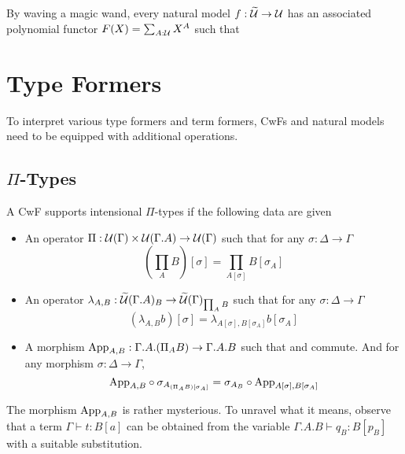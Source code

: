 \documentclass{amsart}
\begin{document}
By waving a magic wand, every natural model $f : \widetilde{\mathcal{U}} \to \mathcal{U}$ has an associated polynomial functor $F(X) = \sum_{A : \mathcal{U}}X^{A}$ such that

\section{Type Formers}
\label{sec:type-formers}

To interpret various type formers and term formers, CwFs and natural models need to be equipped with additional operations.

\subsection{$\Pi$-Types}
\begin{defn}
  A CwF supports intensional $\Pi$-types if the following data are given
  \begin{itemize}
  \item An operator $\Pi : \mathcal{U}(\Gamma) \times \mathcal{U}(\Gamma.A) \to \mathcal{U}(\Gamma)$ such that for any $\sigma : \Delta \to \Gamma$
    \[
      \left(\prod_{A}B\right)[\sigma] = \prod_{A[\sigma]}B[\sigma_{A}]
    \]
  \item An operator $\lambda_{A,B} : \widetilde{\mathcal{U}}(\Gamma.A)_{B} \to \widetilde{\mathcal{U}}(\Gamma)_{\prod_{A}B}$ such that for any $\sigma : \Delta \to \Gamma$
    \[
      (\lambda_{A,B}b)[\sigma] = \lambda_{A[\sigma],B[\sigma_{A}]}b[\sigma_{A}]
    \]
  \item A morphism $\mathrm{App}_{A,B} : \Gamma.A.(\Pi_{A}B) \to \Gamma.A.B$ such that  and  commute.
    And for any morphism $\sigma : \Delta \to \Gamma$, \todo
    \[
      \mathrm{App}_{A,B} \circ \sigma_{A_{(\Pi_{A}B)[\sigma_{A}]}} = \sigma_{A_{B}} \circ \mathrm{App}_{A[\sigma],B[\sigma_{A}]}
    \]
  \end{itemize}
\end{defn}
The morphism $\mathrm{App}_{A,B}$ is rather mysterious.
To unravel what it means, observe that a term $\Gamma \vdash t : B[a]$ can be obtained from the variable $\Gamma.A.B \vdash q_{B} : B[p_{B}]$ with a suitable substitution.
\end{document}
